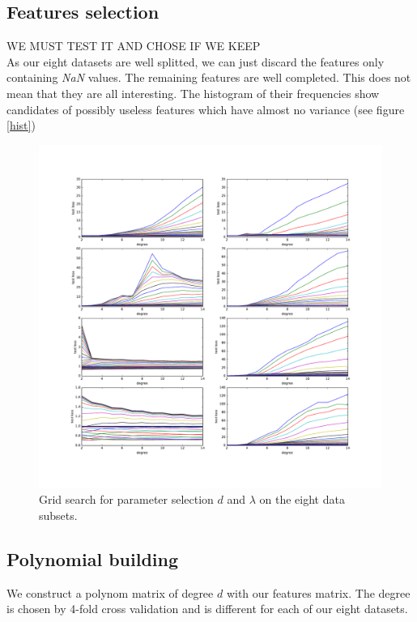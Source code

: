 \documentclass[10pt,conference,compsocconf]{IEEEtran}
\begin{document}
\subsection{Features selection}
{\color{red} WE MUST TEST IT AND CHOSE IF WE KEEP} \\
As our eight datasets are well splitted, we can just discard the features only containing \emph{NaN} values. The remaining features are well completed. This does not mean that they are all interesting. The histogram of their frequencies show candidates of possibly useless features which have almost no variance (see figure \ref{hist})

\begin{figure}[tbp] %
  \centering
  \includegraphics[width=\columnwidth]{img/cross_validation_lot.pdf}
  \caption{Grid search for parameter selection $d$ and $\lambda$ on the eight data subsets. }
  \vspace{-3mm}
  \label{param}
\end{figure}


\subsection{Polynomial building}
We construct a polynom matrix of degree $d$ with our features matrix. The degree is chosen by 4-fold cross validation and is different for each of our eight datasets.
\end{document}
